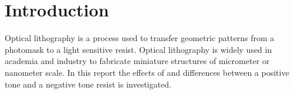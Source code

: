 \section*{Introduction}
Optical lithography is a process used to transfer geometric patterns from a photomask to a light sensitive resist. Optical lithography is widely used in academia and industry to fabricate miniature structures of micrometer or nanometer scale. In this report the effects of and differences between a positive tone and a negative tone resist is investigated.